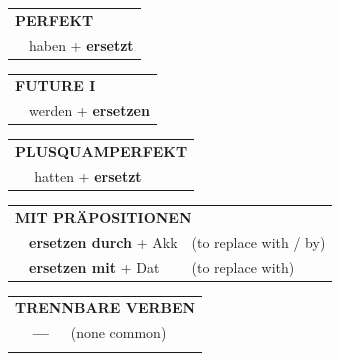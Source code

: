 \documentclass[10pt,a4paper]{revtex4-2}
\begin{document}
\begin{verbbox}
 \begin{tabular}{rl}
     \multicolumn{2}{l}{\textbf{PERFEKT}}\\
   & haben + \textbf{ersetzt}\\
  \end{tabular}
\hfill
   \begin{tabular}{rl}
    \multicolumn{2}{l}{\textbf{FUTURE I} }\\
   & werden + \textbf{ersetzen}\\
  \end{tabular}
\hfill
   \begin{tabular}{rl}
      \multicolumn{2}{l}{\textbf{PLUSQUAMPERFEKT}}\\
   & hatten + \textbf{ersetzt}\\
  \end{tabular}

   \vspace{10pt}

   \begin{tabular}{lll}
      \multicolumn{3}{l}{\textbf{MIT PRÄPOSITIONEN}}\\
& \textbf{ersetzen durch} + Akk & (to replace with / by)\\
& \textbf{ersetzen mit} + Dat & (to replace with)\\
\end{tabular}
  \hfill
   \begin{tabular}{lll}
      \multicolumn{3}{l}{\textbf{TRENNBARE VERBEN}}\\
 & \textbf{---} & (none common)\\
\vspace{10pt}
  \end{tabular}

  \vspace{-5pt}

\end{verbbox}
\end{document}
